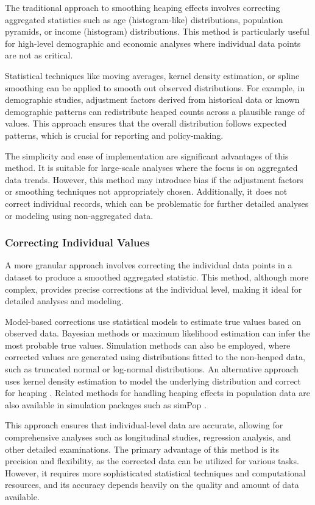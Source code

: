 \documentclass[12pt]{article}
\theoremstyle{plain}
\theoremstyle{definition}
\begin{document}
The traditional approach to smoothing heaping effects
involves correcting aggregated statistics
such as age (histogram-like) distributions,
population pyramids, or income (histogram)
distributions.
This method is particularly useful for high-level demographic and economic analyses
where individual data points are not as critical.

Statistical techniques like moving averages, kernel density estimation, or spline smoothing can be applied to smooth out observed distributions. For example, in demographic studies, adjustment factors derived from historical data or known demographic patterns can redistribute heaped counts across a plausible range of values. This approach ensures that the overall distribution follows expected patterns, which is crucial for reporting and policy-making.

The simplicity and ease of implementation are significant advantages of this method.
It is suitable for large-scale analyses where the focus is on aggregated data trends.
However, this method may introduce bias if the adjustment factors or smoothing techniques
not appropriately chosen. Additionally, it does not correct individual records,
which can be problematic for further detailed analyses or modeling using non-aggregated data.

\subsubsection{Correcting Individual Values}

A more granular approach involves correcting the individual data points in a dataset to produce a smoothed aggregated statistic. This method, although more complex, provides precise corrections at the individual level, making it ideal for detailed analyses and modeling.

Model-based corrections use statistical models to estimate true values based on observed data. Bayesian methods or maximum likelihood estimation can infer the most probable true values. Simulation methods can also be employed, where corrected values are generated using distributions fitted to the non-heaped data, such as truncated normal or log-normal distributions. An alternative approach uses kernel density estimation to model the underlying distribution and correct for heaping \citep{kernelheaping}. Related methods for handling heaping effects in population data are also available in simulation packages such as simPop \citep{simpop}.

This approach ensures that individual-level data are accurate, allowing for comprehensive analyses such as longitudinal studies, regression analysis, and other detailed examinations. The primary advantage of this method is its precision and flexibility, as the corrected data can be utilized for various tasks. However, it requires more sophisticated statistical techniques and computational resources, and its accuracy depends heavily on the quality and amount of data available.
\end{document}
